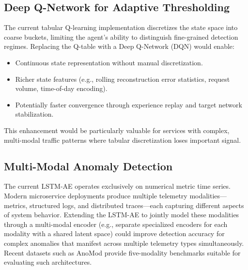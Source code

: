 \subsection{Deep Q-Network for Adaptive Thresholding}
\label{subsec:future_dqn}

The current tabular Q-learning implementation discretizes the state space into
coarse buckets, limiting the agent's ability to distinguish fine-grained
detection regimes. Replacing the Q-table with a Deep Q-Network (DQN)
\cite{turn0search6} would enable:

\begin{itemize}
    \item Continuous state representation without manual discretization.
    \item Richer state features (e.g., rolling reconstruction error
    statistics, request volume, time-of-day encoding).
    \item Potentially faster convergence through experience replay and target
    network stabilization.
\end{itemize}

This enhancement would be particularly valuable for services with complex,
multi-modal traffic patterns where tabular discretization loses important
signal.

\subsection{Multi-Modal Anomaly Detection}
\label{subsec:future_multimodal}

The current LSTM-AE operates exclusively on numerical metric time series.
Modern microservice deployments produce multiple telemetry modalities---metrics,
structured logs, and distributed traces---each capturing different aspects of
system behavior. Extending the LSTM-AE to jointly model these modalities
through a multi-modal encoder (e.g., separate specialized encoders for each
modality with a shared latent space) could improve detection accuracy for
complex anomalies that manifest across multiple telemetry types simultaneously.
Recent datasets such as AnoMod \cite{zhang2019tracing} provide five-modality
benchmarks suitable for evaluating such architectures.

